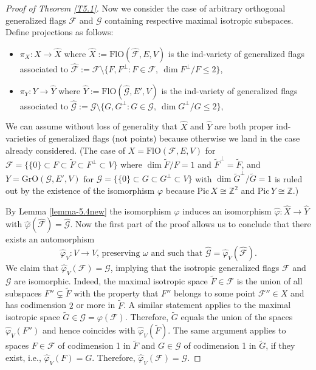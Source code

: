 \documentclass[12pt]{amsart}
\newcommand{\OFlags}{\mathrm{FlO}}
\newcommand{\OGrass}{\mathrm{GrO}}
\newcommand{\Pic}{\mathrm{Pic}}
\theoremstyle{definition}
\begin{document}
\begin{proof}[Proof of Theorem \ref{T5.1}]
Now we consider the case of arbitrary orthogonal generalized flags $\mathcal{F}$ and $\mathcal{G}$ containing respective maximal isotropic subspaces.
Define projections as follows:
\begin{itemize}
\item $\pi_X:X\to\hat{X}$ where
$\hat{X}:=\OFlags(\hat{\mathcal{F}},E,V)$ is the ind-variety of
generalized flags associated to
$\hat{\mathcal{F}}:=\mathcal{F}\setminus\{F,F^\perp:F\in\mathcal{F},\ \dim F^\perp/F\leq 2\}$,
\item $\pi_Y:Y\to\hat{Y}$ where
$\hat{Y}:=\OFlags(\hat{\mathcal{G}},E',V)$ is the ind-variety of
generalized flags associated to
$\hat{\mathcal{G}}:=\mathcal{G}\setminus\{G,G^\perp:G\in\mathcal{G},\ \dim G^\perp/G\leq 2\}$,
\end{itemize}
We can assume without loss of generality that $\hat{X}$ and $\hat{Y}$ are both proper ind-varieties of generalized flags (not points) because otherwise we land in the case already considered.
(The case of 
$X=\OFlags(\mathcal{F},E,V)$ for $\mathcal{F}=\{\{0\}\subset F\subset\tilde{F}\subset F^\perp\subset V\}$ where $\dim \tilde{F}/F=1$ and $\tilde{F}^\perp=\tilde{F}$,
and $Y=\OGrass(\mathcal{G},E',V)$ for $\mathcal{G}=\{\{0\}\subset G\subset G^\perp\subset V\}$ with $\dim \tilde{G}^\perp/\tilde{G}= 1$ is ruled out by the existence of the isomorphism $\varphi$ because $\Pic\,X\cong\mathbb{Z}^2$ and $\Pic\,Y\cong\mathbb{Z}$.)

By Lemma \ref{lemma-5.4new} the isomorphism $\varphi$ induces an isomorphism $\hat\varphi:\hat{X}\to \hat{Y}$
with $\hat\varphi(\hat{\mathcal{F}})=\hat{\mathcal{G}}$.
Now the first part of the proof allows us to conclude that there exists an automorphism 
$$
\mbox{$\hat\varphi_V:V\to V$, preserving $\omega$ and such that $\hat{\mathcal{G}}=\hat\varphi_V(\hat{\mathcal{F}})$}.
$$
We claim that $\hat\varphi_V(\mathcal{F})=\mathcal{G}$, implying that the isotropic generalized flags $\mathcal{F}$ and $\mathcal{G}$ are isomorphic. Indeed, the maximal isotropic space $\tilde{F}\in\mathcal{F}$ is the union of all subspaces $F''\subsetneq\tilde{F}$ with the property that $F''$ belongs to some point $\mathcal{F}''\in X$ and has codimension $2$ or more in $\tilde{F}$. A similar statement applies to the maximal isotropic space $\tilde{G}\in\mathcal{G}=\varphi(\mathcal{F})$. Therefore,  $\tilde{G}$ equals the union of the spaces $\hat\varphi_V(F'')$ and hence coincides with $\hat\varphi_V(\tilde{F})$.
The same argument applies to spaces $F\in\mathcal{F}$ of codimension 1 in $\tilde{F}$ and $G\in\mathcal{G}$ of codimension 1 in $\tilde{G}$, if they exist, i.e., $\hat\varphi_V(F)=G$. Therefore, $\hat\varphi_V(\mathcal{F})=\mathcal{G}$.
\end{proof}
\end{document}
